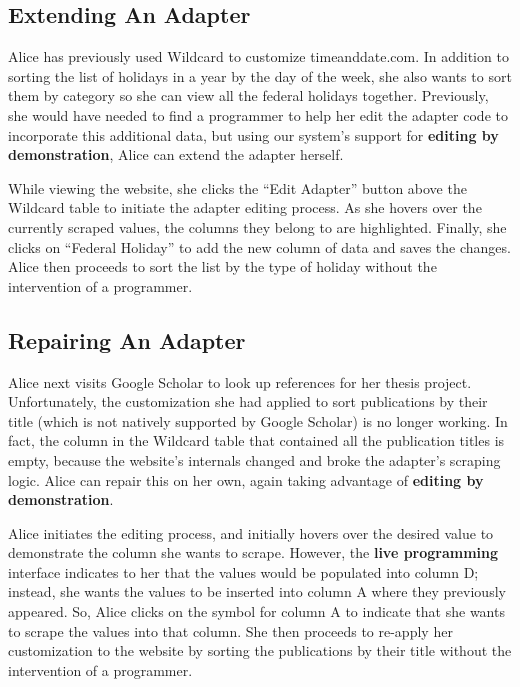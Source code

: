 \documentclass[sigconf,10pt]{acmart}
\begin{document}
\hypertarget{extending-an-adapter}{%
\subsection{Extending An Adapter}\label{extending-an-adapter}}

Alice has previously used Wildcard to customize timeanddate.com. In
addition to sorting the list of holidays in a year by the day of the
week, she also wants to sort them by category so she can view all the
federal holidays together. Previously, she would have needed to find a
programmer to help her edit the adapter code to incorporate this
additional data, but using our system's support for \textbf{editing by
demonstration}, Alice can extend the adapter herself.

While viewing the website, she clicks the ``Edit Adapter'' button above
the Wildcard table to initiate the adapter editing process. As she
hovers over the currently scraped values, the columns they belong to are
highlighted. Finally, she clicks on ``Federal Holiday'' to add the new
column of data and saves the changes. Alice then proceeds to sort the
list by the type of holiday without the intervention of a programmer.

\hypertarget{repairing-an-adapter}{%
\subsection{Repairing An Adapter}\label{repairing-an-adapter}}

Alice next visits Google Scholar to look up references for her thesis
project. Unfortunately, the customization she had applied to sort
publications by their title (which is not natively supported by Google
Scholar) is no longer working. In fact, the column in the Wildcard table
that contained all the publication titles is empty, because the
website's internals changed and broke the adapter's scraping logic.
Alice can repair this on her own, again taking advantage of
\textbf{editing by demonstration}.

Alice initiates the editing process, and initially hovers over the
desired value to demonstrate the column she wants to scrape. However,
the \textbf{live programming} interface indicates to her that the values
would be populated into column D; instead, she wants the values to be
inserted into column A where they previously appeared. So, Alice clicks
on the symbol for column A to indicate that she wants to scrape the
values into that column. She then proceeds to re-apply her customization
to the website by sorting the publications by their title without the
intervention of a programmer.
\end{document}
